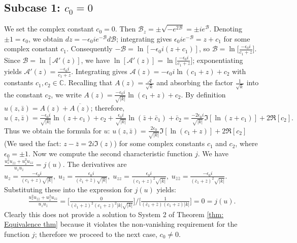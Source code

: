 \documentclass[12pt]{article}
\theoremstyle{plain}
\theoremstyle{definition}
\theoremstyle{remark}
\begin{document}
  \subsection{Subcase 1: $c_0=0$}
   We set the complex constant \(c_0 = 0\). Then \(\mathcal{B}_z = \pm \sqrt{-e^{2\mathcal{B}}} = \pm i e^{\mathcal{B}}\). Denoting \(\pm 1 = \epsilon_0\), we obtain \(dz = -\epsilon_0 i e^{-\mathcal{B}} d\mathcal{B}\); integrating gives \(\epsilon_0 i e^{-\mathcal{B}} = z + c_1\) for some complex constant \(c_1\). Consequently \(-\mathcal{B} = \ln[-\epsilon_0 i (z + c_1)]\), so \(\mathcal{B}=\ln\!\big[\tfrac{-\epsilon_0 i}{c_1 + z}\big]\). Since \(\mathcal{B} = \ln[\mathcal{A}'(z)]\), we have \(\ln[\mathcal{A}'(z)]=\ln\!\big[\tfrac{-\epsilon_0 i}{c_1 + z}\big]\); exponentiating yields \(\mathcal{A}'(z)=\tfrac{-\epsilon_0 i}{c_1 + z}\). Integrating gives \(\mathcal{A}(z)=-\epsilon_0 i\ln(c_1 + z)+c_2\) with constants \(c_1,c_2\in\mathbb{C}\). Recalling that \(A(z)=\frac{\mathcal{A}}{\sqrt{k}}\) and absorbing the factor \(\frac{1}{\sqrt{k}}\) into the constant \(c_2\), we write \(A(z)= \frac{-\epsilon_0 i}{\sqrt{|k|}}\ln(c_1 + z)+c_2\). By definition \(u(z,\bar{z}) = A(z) + \overline{A(z)}\); therefore,
  \[
  u(z, \bar{z}) = \tfrac{-\epsilon_0 i}{\sqrt{|k|}} \ln(z + c_1) + c_2 + \tfrac{ \epsilon_0 i}{\sqrt{|k|}} \ln(\bar{z} + \bar{c}_1) + \bar{c}_2 = \tfrac{-2\epsilon_0 i}{\sqrt{|k|}} \Im[\ln(z + c_1)] + 2\Re[c_2].
  \]
  Thus we obtain the formula for \(u\): \(\boxed{u(z,\bar z) = \tfrac{2\epsilon_0}{\sqrt{|k|}} \Im[\ln(c_1 + z)] + 2\Re[c_2]}\) (We used the fact: \(z-\bar z=2i\Im(z)\)) for some complex constants \(c_1\) and \(c_2\), where \(\epsilon_0 = \pm 1\). Now we compute the second characteristic function \(j\). We have \(\frac{u_z^2u_{\bar z\bar z}+u_{\bar z}^2u_{zz}}{u_z u_{\bar z}} = j(u)\). The derivatives are \(u_z = \tfrac{-\epsilon_0 i}{(c_1 + z)\sqrt{|k|}},\; u_{\bar z} = \tfrac{\epsilon_0 i}{(\bar c_1 + \bar z)\sqrt{|k|}},\; u_{zz} = \tfrac{\epsilon_0 i}{(c_1 + z)^2\sqrt{|k|}},\; u_{\bar z\bar z} = \tfrac{-\epsilon_0 i}{(\bar c_1 + \bar z)^2\sqrt{|k|}}\). Substituting these into the expression for \(j(u)\) yields:
  \[
  \tfrac{u_z^2u_{\bar z\bar z}+u_{\bar z}^2u_{zz}}{u_z u_{\bar z}} = \big[\tfrac{0}{(\bar c_1 + \bar z)^2 (c_1 + z)^2 |k| \sqrt{|k|}}\big]/\big[\tfrac{1}{(\bar c_1 + \bar z)(c_1 + z) |k|}\big]= 0 = j(u).
  \]
  Clearly this does not provide a solution to System 2 of Theorem \ref{thm: Equivalence thm} because it violates the non‑vanishing requirement for the function \(j\); therefore we proceed to the next case, \(c_0\neq 0\).
  
\end{document}
